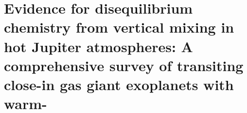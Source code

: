 
\chapter[Evidence for disequilibrium chemistry from vertical mixing in hot Jupiter atmospheres: A comprehensive survey of transiting close-in gas giant exoplanets with warm-\spitzerIRAC]{Evidence for disequilibrium chemistry from vertical mixing in hot Jupiter atmospheres: A comprehensive survey of transiting close-in gas giant exoplanets with warm-\spitzerIRAC}
\label{transits}


\graphicspath{{./gfx/SpitzerStatisticalSurvey/}}


